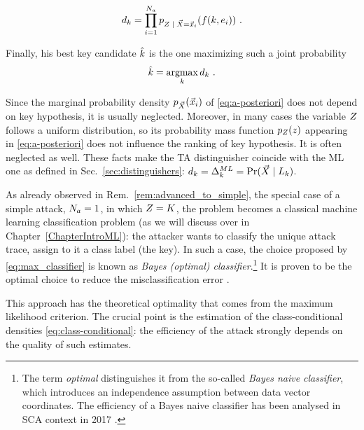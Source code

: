 \begin{equation}\label{eq:joint_distr}
d_{\keyVar} = \prod_{i=1}^{\nbAttackTraces} \pdf_{\given{\sensRandVar}{\vaLeakVec = \vLeakVec_i}}(\sensFunction(\keyVar,\publicParVar_i) ) \mbox{ .}
\end{equation}

Finally, his best key candidate $\hat{k}$ is the one maximizing such a joint probability
\begin{equation}\label{eq:max_classifier}
\hat{k} = \operatorname*{argmax}_{k} d_{k} \mbox{ .}
\end{equation}

\begin{remark}Since the marginal probability density $p_{\vec{X}}(\vec{x}_i)$ of \eqref{eq:a-posteriori} does not depend on key hypothesis, it is usually neglected. Moreover, in many cases the variable $Z$ follows a uniform distribution, so its probability mass function $p_{Z}(z)$ appearing in \eqref{eq:a-posteriori}  does not influence the ranking of key hypothesis. It is often neglected as well. These facts make the TA distinguisher coincide with the ML one as defined in Sec.~\ref{sec:distinguishers}: $d_{\keyVar} = \distinguisher^{ML}_{\keyVar} = \prob(\given{\vaLeakVec}{\leakageModel_\keyVar})$.
\end{remark}

\begin{remark}
As already observed in Rem.~\ref{rem:advanced_to_simple}, the special case of a simple attack, \ie $N_a = 1$, in which $Z = K$, the problem becomes a classical machine learning classification problem (as we will discuss over in Chapter~\ref{ChapterIntroML}): the attacker wants to classify the unique attack trace, \ie assign to it a class label (the key). In such a case, the choice proposed by \eqref{eq:max_classifier} is known as \emph{Bayes (optimal) classifier}.\footnote{The term \emph{optimal} distinguishes it from the so-called \emph{Bayes naive classifier}, which introduces an independence assumption between data vector coordinates. The efficiency of a Bayes naive classifier has been analysed in SCA context in 2017 \cite{picek2017template}.} It is proven to be the optimal choice to reduce the misclassification error \cite{christopher2006pattern}.
\end{remark}

This approach has the theoretical optimality that comes from the maximum likelihood criterion. The crucial point is the estimation of the class-conditional densities \eqref{eq:class-conditional}: the efficiency of the attack strongly depends on the quality of such estimates. 

